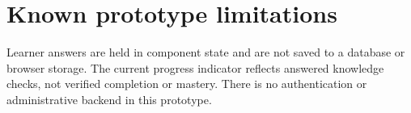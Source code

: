 \section{Known prototype limitations}
Learner answers are held in component state and are not saved to a database or browser storage. The current progress indicator reflects answered knowledge checks, not verified completion or mastery. There is no authentication or administrative backend in this prototype.
